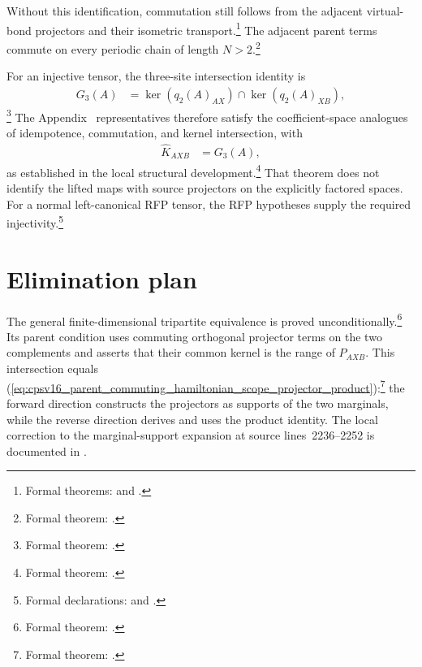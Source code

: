 \documentclass{article}
\begin{document}
Without this identification, commutation still follows from the adjacent
virtual-bond projectors and their isometric transport.\footnote{Formal theorems:
and .}
The adjacent parent terms commute on every periodic chain of length
$N>2$.\footnote{Formal theorem:
.}

For an injective tensor, the three-site intersection identity is
\begin{align}
    G_3(A)
        &=\ker(q_2(A)_{AX})\cap\ker(q_2(A)_{XB}),
    \label{eq:cpsv16_parent_commuting_hamiltonian_scope_three_site_intersection}
\end{align}
\footnote{Formal theorem:
.}
The Appendix~ representatives therefore satisfy the
coefficient-space analogues of idempotence, commutation, and kernel
intersection, with
\begin{align}
    \widehat K_{AXB}
        &=G_3(A),
    \label{eq:cpsv16_parent_commuting_hamiltonian_scope_coefficient_ground_space}
\end{align}
as established in the local structural development.\footnote{Formal theorem:
.}
That theorem does not identify the lifted maps with source projectors on the
explicitly factored spaces. For a normal left-canonical RFP tensor, the RFP
hypotheses supply the required injectivity.\footnote{Formal declarations:
 and
.}

\section{Elimination plan}

The general finite-dimensional tripartite equivalence is proved
unconditionally.\footnote{Formal theorem:
.} Its parent
condition uses commuting orthogonal projector terms on the two complements and
asserts that their common kernel is the range of $P_{AXB}$. This intersection equals
(\ref{eq:cpsv16_parent_commuting_hamiltonian_scope_projector_product}):\footnote{Formal
theorem:
.}
the forward direction constructs the projectors as supports of the two
marginals, while the reverse direction derives and uses the product identity.
The local correction to the marginal-support expansion at source
lines~2236--2252 is documented in
.
\end{document}
